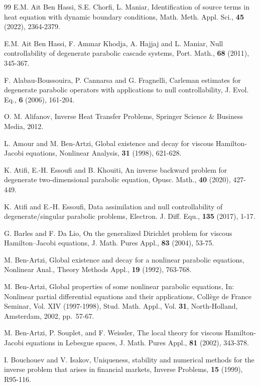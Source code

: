\documentclass[reqno]{amsart}
\theoremstyle{plain}
\theoremstyle{remark}
\numberwithin{equation}{section}
\begin{document}
\begin{thebibliography}{99}
 E.M. Ait Ben Hassi, S.E. Chorfi, L. Maniar, Identification of source terms in heat equation with dynamic boundary conditions, Math. Meth. Appl. Sci., \textbf{45} (2022), 2364-2379.

 E.M. Ait Ben Hassi, F. Ammar Khodja, A. Hajjaj and L. Maniar, Null controllability of degenerate parabolic cascade systems, Port. Math., \textbf{68} (2011), 345-367.

 F. Alabau-Boussouira, P. Cannarsa and G. Fragnelli, Carleman estimates for degenerate parabolic operators with applications to null controllability, J. Evol. Eq., \textbf{6} (2006), 161-204.

O. M. Alifanov, Inverse Heat Transfer Problems,
Springer Science \& Business Media, 2012.

 L. Amour and M. Ben-Artzi, Global existence and decay for viscous Hamilton-Jacobi equations, Nonlinear Analysis,  \textbf{31} (1998), 621-628.

 K. Atifi, E.-H. Essoufi and B. Khouiti, An inverse backward problem for degenerate two-dimensional parabolic equation, Opusc. Math., \textbf{40} (2020), 427-449.

 K. Atifi and E.-H. Essoufi, Data assimilation and null controllability of degenerate/singular parabolic problems, Electron. J. Diff. Equ., \textbf{135} (2017), 1-17.

 G. Barles and F. Da Lio, On the generalized Dirichlet problem for viscous Hamilton–Jacobi equations, J. Math. Pures Appl., \textbf{83} (2004), 53-75.

 M. Ben-Artzi, Global existence and decay for a nonlinear parabolic equations, Nonlinear Anal., Theory Methods Appl., \textbf{19} (1992), 763-768.

 M. Ben-Artzi, Global properties of some nonlinear parabolic equations, In: Nonlinear partial differential equations and their applications, Coll\`ege de France Seminar, Vol. XIV (1997-1998), Stud. Math. Appl., Vol. \textbf{31}, North-Holland, Amsterdam, 2002, pp.~57-67.

 M. Ben-Artzi, P. Souplet, and F. Weissler, The local theory for viscous Hamilton-Jacobi equations in Lebesgue spaces, J. Math. Pures Appl., \textbf{81} (2002), 343-378.

 I. Bouchouev and V. Isakov, Uniqueness, stability and numerical methods for the inverse problem that arises in financial markets, Inverse Problems, \textbf{15} (1999), R95-116.


\end{thebibliography}
\end{document}
